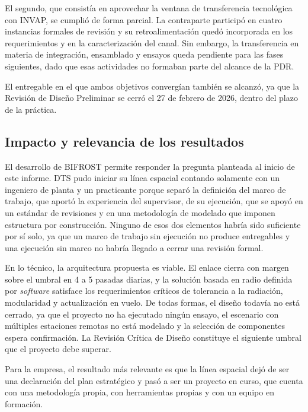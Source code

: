 El segundo, que consistía en aprovechar la ventana de transferencia tecnológica con INVAP, se cumplió de forma parcial. La contraparte participó en cuatro instancias formales de revisión y su retroalimentación quedó incorporada en los requerimientos y en la caracterización del canal. Sin embargo, la transferencia en materia de integración, ensamblado y ensayos queda pendiente para las fases siguientes, dado que esas actividades no formaban parte del alcance de la PDR.

El entregable en el que ambos objetivos convergían también se alcanzó, ya que la Revisión de Diseño Preliminar se cerró el 27 de febrero de 2026, dentro del plazo de la práctica.


\subsection{Impacto y relevancia de los resultados}

El desarrollo de BIFROST permite responder la pregunta planteada al inicio de este informe. DTS pudo iniciar su línea espacial contando solamente con un ingeniero de planta y un practicante porque separó la definición del marco de trabajo, que aportó la experiencia del supervisor, de su ejecución, que se apoyó en un estándar de revisiones y en una metodología de modelado que imponen estructura por construcción. Ninguno de esos dos elementos habría sido suficiente por sí solo, ya que un marco de trabajo sin ejecución no produce entregables y una ejecución sin marco no habría llegado a cerrar una revisión formal.

En lo técnico, la arquitectura propuesta es viable. El enlace cierra con margen sobre el umbral en 4 a 5 pasadas diarias, y la solución basada en radio definida por \textit{software} satisface los requerimientos críticos de tolerancia a la radiación, modularidad y actualización en vuelo. De todas formas, el diseño todavía no está cerrado, ya que el proyecto no ha ejecutado ningún ensayo, el escenario con múltiples estaciones remotas no está modelado y la selección de componentes espera confirmación. La Revisión Crítica de Diseño constituye el siguiente umbral que el proyecto debe superar.

Para la empresa, el resultado más relevante es que la línea espacial dejó de ser una declaración del plan estratégico y pasó a ser un proyecto en curso, que cuenta con una metodología propia, con herramientas propias y con un equipo en formación.
